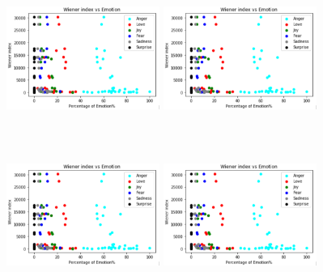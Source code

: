 \documentclass[acmtog]{acmart}
\begin{document}
\begin{figure}[h]
  \begin{minipage}{.33\textwidth}
    \centering
    \includegraphics[width=5cm,height=5cm,keepaspectratio]{WAnger_ws.pdf}
  \end{minipage}%
  \begin{minipage}{.33\textwidth}
    \centering
    \includegraphics[width=5cm,height=5cm,keepaspectratio]{WAnger_ws.pdf}
  \end{minipage}%
  \begin{minipage}{.33\textwidth}
    \centering
    \includegraphics[width=5cm,height=5cm,keepaspectratio]{WAnger_ws.pdf}
  \end{minipage}
 \medskip
  \begin{minipage}{.33\textwidth}
    \centering
    \includegraphics[width=5cm,height=5cm,keepaspectratio]{WAnger_ws.pdf}

\end{minipage}
\end{figure}
\end{document}
